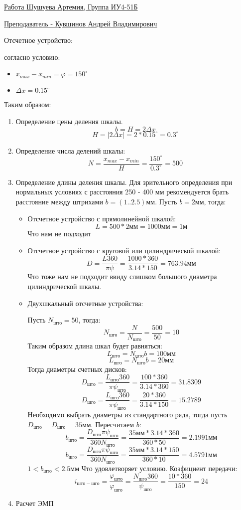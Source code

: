 \documentclass{article}
\begin{document}
\underline{Работа Шушуева Артемия, Группа ИУ4-51Б}

\underline{Преподаватель - Кувшинов Андрей Владимирович}

Отсчетное устройство:

согласно условию:
\begin{itemize}
	\item $x_{max} - x_{min} = \varphi = 150^{\circ}$
	\item $ \Delta x = 0.15^{\circ}$
\end{itemize}

Таким образом:
\begin{enumerate}
	\item Определение цены деления шкалы.
	$$
	b = H = 2 \Delta x
	$$
	$$
	H = |2 \Delta x| = 2 * 0.15^{\circ} = 0.3^{\circ}
	$$
	\item Определение числа делений шкалы:
	$$
	N = \frac{x_{max} - x_{min}}{H} = \frac{150^{\circ}}{0.3^{\circ}} = 500
	$$
	\item Определение длины деления шкалы. Для зрительного определения при нормальных условиях с расстояния 250 - 400 мм рекомендуется брать расстояние между штрихами $b = (1..2.5) мм$. Пусть $b = 2 мм$, тогда:
	\begin{itemize}
		\item Отсчетное устройство с прямолинейной шкалой:	
		$$
		L = 500 * 2 мм = 1000 мм = 1 м
		$$
		Что нам не подходит
		\item Отсчетное устройство с круговой или цилиндрической шкалой:
		$$
		D = \frac{L 360}{ \pi \psi} = \frac{1000 * 360}{3.14 * 150} = 763.94 мм
		$$
		Что тоже нам не подходит ввиду слишком большого диаметра цилиндрической шкалы.
		\item Двухшкальный отсчетные устройства:

		Пусть $N_{што} = 50$, тогда:
		$$
		N_{шго} = \frac{N}{N_{што}} = \frac{500}{50} = 10
		$$
		Таким образом длина шкал будет равняться:
		$$
		L_{што} = N_{што} b = 100 мм
		$$
		$$
		L_{шго} = N_{шго} b = 20 мм
		$$
		Тогда диаметры счетных дисков:
		$$
		D_{што} = \frac{L_{што} 360}{ \pi \psi_{што}} = \frac{100 * 360}{3.14 * 360} = 31.8309 
		$$
		$$
		D_{шго} = \frac{L_{шго} 360}{ \pi \psi_{шго}} = \frac{20 * 360}{3.14 * 150} = 15.2789
		$$
		Необходимо выбрать диаметры из стандартного ряда, тогда пусть $D_{што} = D_{шго} = 35 мм$. Пересчитаем $b$:
		$$
		b_{што} = \frac{D_{што} \pi \psi_{што}}{360 N_{што}} = \frac{35 мм * 3.14 * 360}{360 * 50} = 2.1991 мм
		$$
		$$
		b_{шго} = \frac{D_{шго} \pi \psi_{шго}}{360 N_{шго}} = \frac{35 мм * 3.14 * 150}{360 * 10} = 4.5791 мм
		$$
		$ 1 < b_{што} < 2.5 мм$ Что удовлетворяет условию. Коэфициент передачи:
		$$
		i_{што-шго} = \frac{ \varphi_{што}}{ \varphi_{шго}} = \frac{N_{шго} 360}{ \psi_{шго}} = \frac{10 * 360}{150} = 24 
		$$
	\end{itemize}
	\item Расчет ЭМП


\end{enumerate}
\end{document}
